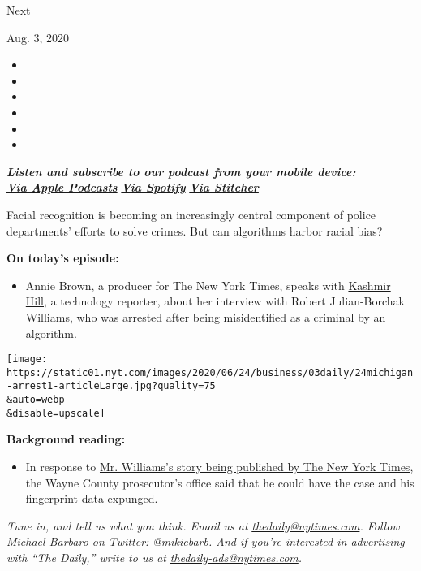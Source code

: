 Next

Aug. 3, 2020

\begin{itemize}
\item
\item
\item
\item
\item
\item
\end{itemize}

\emph{\textbf{Listen and subscribe to our podcast from your mobile
device:}}\\
\textbf{\href{https://itunes.apple.com/us/podcast/the-daily/id1200361736?mt=2}{\emph{Via
Apple Podcasts}}} \emph{\textbf{\textbar{}}}
\textbf{\href{https://open.spotify.com/show/3IM0lmZxpFAY7CwMuv9H4g?si=SfuMSC55R1qprFsRZU3_zw}{\emph{Via
Spotify}}} \emph{\textbf{\textbar{}}}
\textbf{\href{http://www.stitcher.com/podcast/the-new-york-times/the-daily-10}{\emph{Via
Stitcher}}}

Facial recognition is becoming an increasingly central component of
police departments' efforts to solve crimes. But can algorithms harbor
racial bias?

\textbf{On today's episode:}

\begin{itemize}
\tightlist
\item
  Annie Brown, a producer for The New York Times, speaks with
  \href{https://www.nytimes.com/by/kashmir-hill}{Kashmir Hill}, a
  technology reporter, about her interview with Robert Julian-Borchak
  Williams, who was arrested after being misidentified as a criminal by
  an algorithm.
\end{itemize}

\texttt{[image: https://static01.nyt.com/images/2020/06/24/business/03daily/24michigan-arrest1-articleLarge.jpg?quality=75\\\&auto=webp\\\&disable=upscale]}

\textbf{Background reading:}

\begin{itemize}
\tightlist
\item
  In response to
  \href{https://www.nytimes.com/2020/06/24/technology/facial-recognition-arrest.html}{Mr.
  Williams's story being published by The New York Times}, the Wayne
  County prosecutor's office said that he could have the case and his
  fingerprint data expunged.
\end{itemize}

\emph{Tune in, and tell us what you think. Email us at}
\href{mailto:thedaily@nytimes.com}{\emph{thedaily@nytimes.com}}\emph{.
Follow Michael Barbaro on Twitter:}
\href{https://twitter.com/mikiebarb}{\emph{@mikiebarb}}\emph{. And if
you're interested in advertising with ``The Daily,'' write to us at}
\href{mailto:thedaily-ads@nytimes.com}{\emph{thedaily-ads@nytimes.com}}\emph{.}

